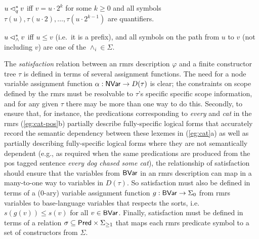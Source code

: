 \begin{definition}\label{defn:dominance}
$u \lhd^*_q v$ iff $v = u \cdot 2^k$ for some $k \geq 0$ and all
  symbols $\tau(u), \tau(u \cdot 2), \ldots, \tau(u \cdot 2^{k-1})$
  are quantifiers.

$u \lhd^*_\wedge v$ iff $u \leq v$ (i.e.\ it is a prefix), and all
  symbols on the path from $u$ to $v$ (not including $v$) are one of
  the $\wedge_i \in \Sigma$.
\end{definition}

The {\em satisfaction} relation between an {\sc rmrs} description $\varphi$
and a finite constructor tree $\tau$ is defined in terms of several
assignment functions.  The need for a 
node variable
assignment function
$\alpha:
\mathsf{NVar}
\rightarrow D(\tau)$ is clear; the
constraints on scope defined by the {\sc rmrs} must be resolvable to
$\tau$'s specific
specific scope information, and for any given $\tau$ there may be more
than one way to do this.
Secondly, to ensure that, for
instance, the predications corresponding to {\em every} and {\em cat}
in the {\sc rmrs}
(\ref{eg:cat-pos}b)  partially describe fully-specific
logical forms that accurately record the semantic dependency between
these lexemes in (\ref{eg:cat}a) as well as partially describing
fully-specific logical forms where they are not semantically
dependent (e.g., as required when the same predications are produced
from the {\sc pos} tagged sentence {\em every dog chased some cat}),
the relationship of satisfaction 
should ensure that the variables from $\mathsf{BVar}$ in an
{\sc rmrs} description can
map in a many-to-one way to variables in $D(\tau)$.  So
satisfaction must also be defined in
terms of 
a (0-ary) variable assignment function
$g:\mathsf{BVar} \rightarrow \Sigma_0$ from {\sc rmrs} variables to 
base-language variables that respects the sorts, i.e.\
$s(g(v)) \leq s(v)$ for all $v \in \mathsf{BVar}$.  Finally, satisfaction must
be defined in terms of a relation $\sigma \subseteq
\mathsf{Pred} \times \Sigma_{\geq 1}$ that maps each
{\sc rmrs} predicate symbol to a set of constructors from $\Sigma$.

